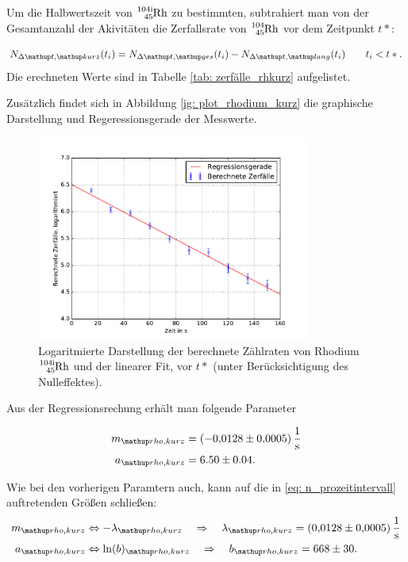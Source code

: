 Um die Halbwertszeit von $\ce{^{104i}_{45} Rh}$ zu bestimmten, subtrahiert man von der
Gesamtanzahl der Akivitäten die Zerfallsrate von $\ce{^{104}_{45} Rh}$ vor dem
Zeitpunkt $t*$:

\begin{equation*}
  N_{\Delta \map{t}, \map{kurz}}(t_i)=N_{\Delta \map{t}, \map{ges}}(t_i)-N_{\Delta \map{t}, \map{lang}}(t_i) \qquad t_i<t*.
\end{equation*}
Die erechneten Werte sind in Tabelle \ref{tab: zerfälle_rhkurz} aufgelistet.

Zusätzlich findet sich in Abbildung \ref{ig: plot_rhodium_kurz} die graphische Darstellung
und Regeressionsgerade der Messwerte.

\begin{figure}
  \centering
  \includegraphics[width=0.8\textwidth]{pics/rhodium_kurz_berechnet.pdf}
  \caption{Logaritmierte Darstellung der berechnete Zählraten von Rhodium $\ce{^{104i}_{45} Rh}$ und der linearer Fit, vor $t*$ (unter Berücksichtigung des Nulleffektes).}
  \label{fig: plot_rhodium_kurz}
\end{figure}

Aus der Regressionsrechung erhält man folgende Parameter

\begin{align}
  \label{eq:parameter_rhodium_kurz}
  \begin{aligned}
    m\ua{rho,kurz}&=\SI{-0.0128\pm0.0005}{\per\second}\\
    a\ua{rho,kurz}&=6.50\pm0.04.
  \end{aligned}
\end{align}

Wie bei den vorherigen Paramtern auch, kann auf die in \eqref{eq: n_prozeitintervall} auftretenden Größen
schließen:
\begin{align}
  \label{eq:parameter_rhodium_kurz_lambda}
  \begin{aligned}
    m\ua{rho,kurz}&\Leftrightarrow -\lambda\ua{rho,kurz} \quad \Rightarrow \quad \lambda\ua{rho,kurz}=\SI{0.0128\pm0.0005}{\per\second}\\
    a\ua{rho,kurz}&\Leftrightarrow \ln(b)\ua{rho,kurz} \quad \Rightarrow \quad b\ua{rho,kurz} =668\pm 30.
  \end{aligned}
\end{align}

